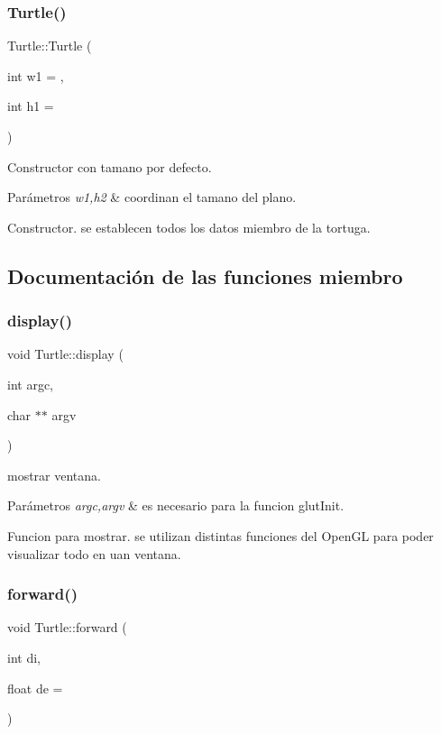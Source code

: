 \subsubsection{\texorpdfstring{Turtle()}{Turtle()}}
{\footnotesize\ttfamily Turtle\+::\+Turtle (\begin{DoxyParamCaption}\item[{int}]{w1 = {},  }\item[{int}]{h1 = {} }\end{DoxyParamCaption})}

Constructor con tamano por defecto. 
\begin{DoxyParams}{Parámetros}
{\em w1,h2} & coordinan el tamano del plano.\\
\hline
\end{DoxyParams}
Constructor. se establecen todos los datos miembro de la tortuga. 

\subsection{Documentación de las funciones miembro}
\mbox{\label{classTurtle_ae62d0d6d90add2c86baa14ae01cdbe4a}} 
\subsubsection{\texorpdfstring{display()}{display()}}
{\footnotesize\ttfamily void Turtle\+::display (\begin{DoxyParamCaption}\item[{int}]{argc,  }\item[{char $\ast$$\ast$}]{argv }\end{DoxyParamCaption})}

mostrar ventana. 
\begin{DoxyParams}{Parámetros}
{\em argc,argv} & es necesario para la funcion glut\+Init.\\
\hline
\end{DoxyParams}
Funcion para mostrar. se utilizan distintas funciones del Open\+GL para poder visualizar todo en uan ventana. \mbox{\label{classTurtle_acf384dcc28f8f002c0134a9a13567d36}} 
\subsubsection{\texorpdfstring{forward()}{forward()}}
{\footnotesize\ttfamily void Turtle\+::forward (\begin{DoxyParamCaption}\item[{int}]{di,  }\item[{float}]{de = {} }\end{DoxyParamCaption})}

